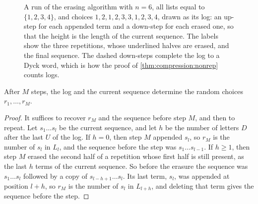 \begin{refsection}
\begin{figure}[t]
\centering
{}
\caption{A run of the erasing algorithm with $n=6$, all lists equal to $\{1,2,3,4\}$, and choices $1,2,1,2,3,3,1,2,3,4$, drawn as its log: an up-step for each appended term and a down-step for each erased one, so that the height is the length of the current sequence. The labels show the three repetitions, whose underlined halves are erased, and the final sequence. The dashed down-steps complete the log to a Dyck word, which is how the proof of \cref{thm:compression:nonrep} counts logs.}
\label{fig:compression:dyck}
\end{figure}

\begin{lemma}\label{lem:compression:nonrep-rewind}
After $M$ steps, the log and the current sequence determine the random choices $r_1,\dots,r_M$.
\end{lemma}

\begin{proof}
It suffices to recover $r_M$ and the sequence before step $M$, and then to repeat. Let $s_1\dots s_l$ be the current sequence, and let $h$ be the number of letters $D$ after the last $U$ of the log. If $h=0$, then step $M$ appended $s_l$, so $r_M$ is the number of $s_l$ in $L_l$, and the sequence before the step was $s_1\dots s_{l-1}$. If $h\ge1$, then step $M$ erased the second half of a repetition whose first half is still present, as the last $h$ terms of the current sequence. So before the erasure the sequence was $s_1\dots s_l$ followed by a copy of $s_{l-h+1}\dots s_l$. Its last term, $s_l$, was appended at position $l+h$, so $r_M$ is the number of $s_l$ in $L_{l+h}$, and deleting that term gives the sequence before the step.
\end{proof}


\end{refsection}
